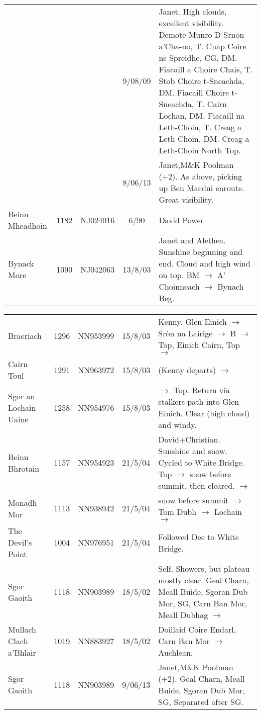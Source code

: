 \documentclass[10pt,a4paper]{article}
\begin{document}
\begin{tabular}{p{4cm}cccp{6cm}}
&&&9/08/09&Janet. High clouds, excellent visibility. Demote Munro D  Srnon a'Cha-no,
T. Cnap Coire ns Spreidhe, CG, DM. Fiacaill a Choire Chais, T. Stob Choire t-Sneachda,
DM. Fiacaill Choire  t-Sneachda, T. Cairn Lochan, DM. Fiacaill na Leth-Choin,
T. Creag a Leth-Choin, DM. Creag a Leth-Choin North Top.\\
&&&8/06/13&Janet,M\&K Poolman (+2). As above, picking up Ben Macdui enroute. Great visibility.\\
Beinn Mheadhoin & 1182  & NJ024016&6/90&David Power \\
Bynack More & 1090  & NJ042063&13/8/03&Janet and Alethea. Sunshine beginning and end.
Cloud and high wind on top. BM $\rightarrow$ A' Choinneach $\rightarrow$ Bynach Beg.\\
\end{tabular}

\begin{tabular}{p{4cm}cccp{6cm}}
Braeriach  & 1296  & NN953999 &15/8/03&Kenny. Glen Einich
$\rightarrow$ Sr\`on na Lairige $\rightarrow$ B $\rightarrow$
Top, Einich Cairn, Top $\rightarrow$  \\
Cairn Toul  & 1291  & NN963972 &15/8/03& (Kenny departs) $\rightarrow$  \\
Sgor an Lochain Uaine  & 1258 & NN954976 &15/8/03& $\rightarrow$ Top. Return via
stalkers path into Glen Einich. Clear (high cloud) and windy.\\
Beinn Bhrotain & 1157  & NN954923&21/5/04&David+Christian.
Sunshine and snow. Cycled to White Bridge. Top $\rightarrow$ snow
before summit, then cleared. $\rightarrow$\\
Monadh Mor  & 1113  & NN938942 &21/5/04& snow before summit $\rightarrow$ Tom Dubh $\rightarrow$
Lochain $\rightarrow$  \\
The Devil's Point  & 1004  & NN976951 &21/5/04& Followed Dee to White Bridge.   \\
Sgor Gaoith & 1118  & NN903989  &18/5/02& Self. Showers, but
plateau mostly clear.
Geal Charn, Meall Buide, Sgoran Dub Mor, SG, Carn Ban Mor, Meall Dubhag  $\rightarrow$ \\
Mullach Clach a'Bhlair  & 1019  & NN883927 &18/5/02& Doillaid
Coire Endarl,
Carn Ban Mor $\rightarrow$ Auchlean.\\
Sgor Gaoith & 1118  & NN903989  &9/06/13&Janet,M\&K Poolman (+2). Geal Charn, Meall Buide, Sgoran Dub Mor, SG, Separated after SG.\\
\end{tabular}


\newpage
\end{document}
